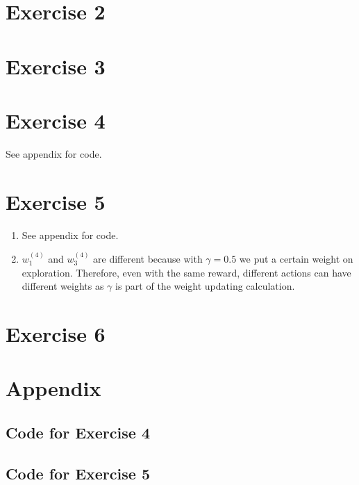 \documentclass[12pt]{article}
\begin{document}
\section*{Exercise 2}

\section*{Exercise 3}

\section*{Exercise 4}
See \refname{appendix} for code.


\section*{Exercise 5}
\begin{enumerate}[label=(\alph*)]
	\item See \refname{appendix} for code.
        
    \item \(w_1^{(4)}\) and \(w_3^{(4)}\) are different because with \(\gamma = 0.5\) we put a certain weight on exploration.
        Therefore, even with the same reward, different actions can have different weights as \(\gamma\) is part of the weight updating calculation.
\end{enumerate}


\section*{Exercise 6}


\section*{Appendix}\label{appendix}
\subsection*{Code for Exercise 4}

\subsection*{Code for Exercise 5}

\end{document}
